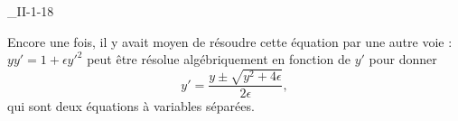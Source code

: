 \begin{corrige}{_II-1-18}
\begin{alternative}
Encore une fois, il y avait moyen de résoudre cette équation par une autre voie : $yy'=1+\epsilon y'^2$ peut être résolue algébriquement en fonction de $y'$ pour donner
\begin{equation}
	y'=\frac{ y\pm \sqrt{y^2+4\epsilon} }{ 2\epsilon },
\end{equation}
qui sont deux équations à variables séparées.


\end{alternative}
\end{corrige}

